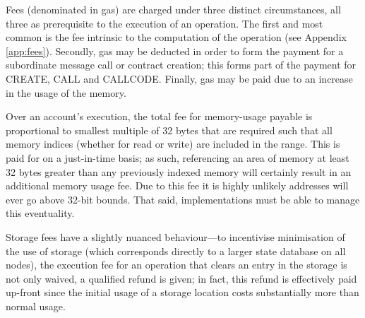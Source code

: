 \documentclass[9pt,oneside]{amsart}
\begin{document}
\begin{multicols}{2}
Fees (denominated in gas) are charged under three distinct circumstances, all three as prerequisite to the execution of an operation. The first and most common is the fee intrinsic to the computation of the operation (see Appendix \ref{app:fees}). Secondly, gas may be deducted in order to form the payment for a subordinate message call or contract creation; this forms part of the payment for {\small CREATE}, {\small CALL} and {\small CALLCODE}. Finally, gas may be paid due to an increase in the usage of the memory.

Over an account's execution, the total fee for memory-usage payable is proportional to smallest multiple of 32 bytes that are required such that all memory indices (whether for read or write) are included in the range. This is paid for on a just-in-time basis; as such, referencing an area of memory at least 32 bytes greater than any previously indexed memory will certainly result in an additional memory usage fee. Due to this fee it is highly unlikely addresses will ever go above 32-bit bounds. That said, implementations must be able to manage this eventuality.

Storage fees have a slightly nuanced behaviour---to incentivise minimisation of the use of storage (which corresponds directly to a larger state database on all nodes), the execution fee for an operation that clears an entry in the storage is not only waived, a qualified refund is given; in fact, this refund is effectively paid up-front since the initial usage of a storage location costs substantially more than normal usage.


\end{multicols}
\end{document}
